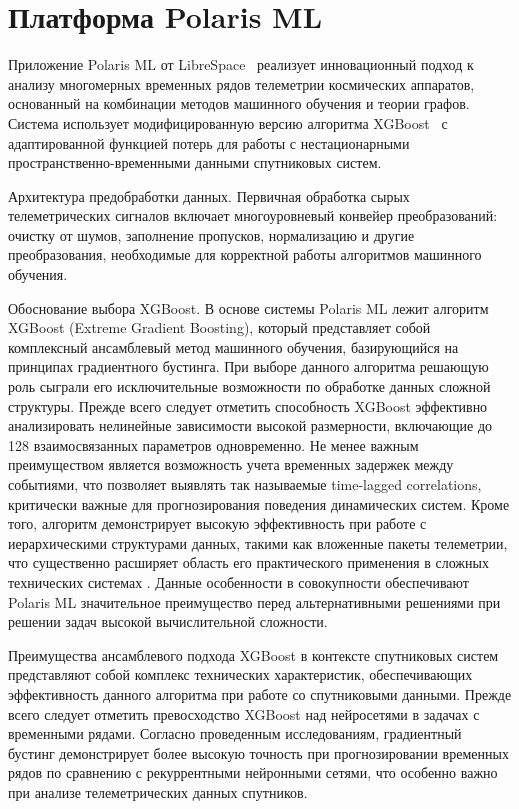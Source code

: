 \chapter{Платформа Polaris ML}

Приложение Polaris ML от LibreSpace~\cite{librespace_docs} реализует
инновационный подход к анализу многомерных временных рядов телеметрии
космических аппаратов, основанный на комбинации методов машинного обучения и
теории графов. Система использует модифицированную версию алгоритма
XGBoost~\cite{xgboost_docs} с адаптированной функцией потерь для работы с
нестационарными пространственно-временными данными спутниковых систем.

Архитектура предобработки данных. Первичная обработка сырых телеметрических сигналов включает многоуровневый
конвейер преобразований: очистку от шумов, заполнение пропусков, нормализацию и
другие преобразования, необходимые для корректной работы алгоритмов машинного
обучения.

Обоснование выбора XGBoost. В основе системы Polaris ML лежит алгоритм XGBoost (Extreme Gradient Boosting),
который представляет собой комплексный ансамблевый метод машинного обучения,
базирующийся на принципах градиентного бустинга. При выборе данного алгоритма
решающую роль сыграли его исключительные возможности по обработке данных сложной
структуры. Прежде всего следует отметить способность XGBoost эффективно
анализировать нелинейные зависимости высокой размерности, включающие до 128
взаимосвязанных параметров одновременно. Не менее важным преимуществом является
возможность учета временных задержек между событиями, что позволяет выявлять так
называемые time-lagged correlations, критически важные для прогнозирования
поведения динамических систем. Кроме того, алгоритм демонстрирует высокую
эффективность при работе с иерархическими структурами данных, такими как
вложенные пакеты телеметрии, что существенно расширяет область его практического
применения в сложных технических системах \cite{luppen2021introducing}. Данные
особенности в совокупности обеспечивают Polaris ML значительное преимущество
перед альтернативными решениями при решении задач высокой вычислительной
сложности.

Преимущества ансамблевого подхода XGBoost в контексте спутниковых систем
представляют собой комплекс технических характеристик, обеспечивающих
эффективность данного алгоритма при работе со спутниковыми данными.
Прежде всего следует отметить превосходство XGBoost над нейросетями в задачах с
временными рядами. Согласно проведенным исследованиям, градиентный бустинг
демонстрирует более высокую точность при прогнозировании временных рядов по
сравнению с рекуррентными нейронными сетями, что особенно важно при анализе
телеметрических данных спутников.


